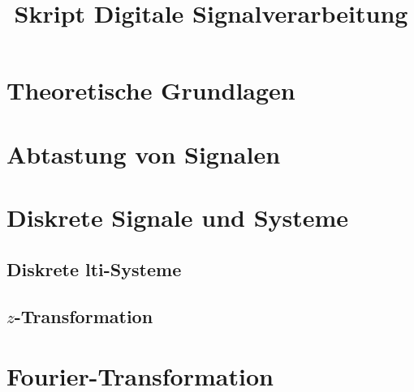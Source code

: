 \documentclass[ngerman]{article}
\title{Skript Digitale Signalverarbeitung}
\begin{document}

%
%
\section{Theoretische Grundlagen}\label{basics}
%

%
%
\section{Abtastung von Signalen}\label{sec:sampling}
%

%
%
%
\section{Diskrete Signale und Systeme}\label{disc_sys}
%

%
\subsection{Diskrete \texorpdfstring{\acrshort{lti}}{LTI}-Systeme}\label{sec:disc_lti}
%

%
%
\subsection{\texorpdfstring{$z$}{z}-Transformation}\label{ztrafo}
%

%
%
\section{Fourier-Transformation}\label{sec:fourier}
%

%

\end{document}
